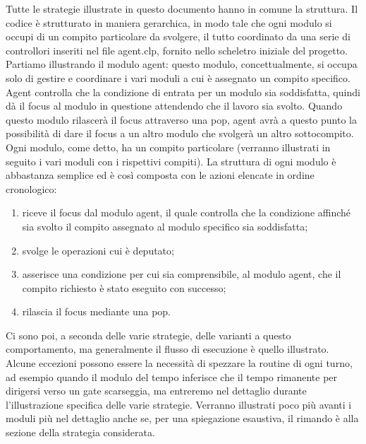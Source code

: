 Tutte le strategie illustrate in questo documento hanno in comune la struttura.
Il codice è strutturato in maniera gerarchica, in modo tale che ogni modulo si occupi di un compito particolare da svolgere, il tutto coordinato da una serie di controllori inseriti nel file {\color{red}agent.clp}, fornito nello scheletro iniziale del progetto.
Partiamo illustrando il modulo agent: questo modulo, concettualmente, si occupa solo di gestire e coordinare i vari moduli a cui è assegnato un compito specifico. Agent controlla che la condizione di entrata per un modulo sia soddisfatta, quindi dà il focus al modulo in questione attendendo che il lavoro sia svolto. Quando questo modulo rilascerà il focus attraverso una pop, agent avrà a questo punto la possibilità di dare il focus a un altro modulo che svolgerà un altro sottocompito.
Ogni modulo, come detto, ha un compito particolare (verranno illustrati in seguito i vari moduli con i rispettivi compiti). La struttura di ogni modulo è abbastanza semplice ed è così composta con le azioni elencate in ordine cronologico: 
\begin{enumerate}
	\item riceve il focus dal modulo agent, il quale controlla che la condizione affinché sia svolto il compito assegnato al modulo specifico sia soddisfatta;
	\item svolge le operazioni cui è deputato;
	\item asserisce una condizione per cui sia comprensibile, al modulo agent, che il compito richiesto è stato eseguito con successo;
	\item rilascia il focus mediante una pop.
\end{enumerate}
Ci sono poi, a seconda delle varie strategie, delle varianti a questo comportamento, ma generalmente il flusso di esecuzione è quello illustrato. Alcune eccezioni possono essere la necessità di spezzare la routine di ogni turno, ad esempio quando il modulo del tempo inferisce che il tempo rimanente per dirigersi verso un gate scarseggia, ma entreremo nel dettaglio durante l'illustrazione specifica delle varie strategie.
Verranno illustrati poco più avanti i moduli più nel dettaglio anche se, per una spiegazione esaustiva, il rimando è alla sezione della strategia considerata.

